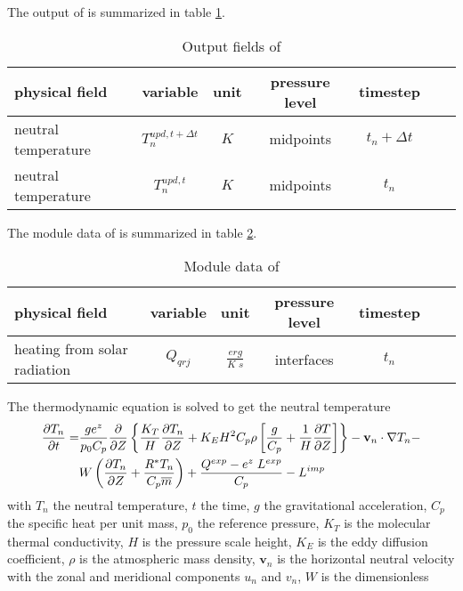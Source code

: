 %
The output of  is summarized in table
\ref{tab:output_dt}.
%
\begin{table}[tb]
\begin{tabular}{|p{3.5cm} ||c|c|c|c|c|c|} \hline
physical field               & variable        & unit&pressure
level& timestep \\ \hline \hline
neutral temperature    &       {$T_n^{upd,t+\Delta t}$}     & $K$   & midpoints  & $t_n+\Delta t$ \\
neutral temperature     &       {$T_n^{upd,t}$}     & $K$   &
midpoints & $t_n$
\\ \hline \hline
\end{tabular}
\caption{Output fields of } \label{tab:output_dt}
\end{table}
%
%
The module data of  is summarized in table
\ref{tab:module_dt}.
%
\begin{table}[tb]
\begin{tabular}{|p{3.5cm} ||c|c|c|c|c|c|} \hline
physical field               & variable        & unit&pressure
level& timestep \\ \hline \hline heating from solar radiation    &
{$Q_{qrj}$}     & $\frac{erg}{K \; s}$   & interfaces  & $t_n$
\\ \hline \hline
\end{tabular}
\caption{Module data of } \label{tab:module_dt}
\end{table}
%
The thermodynamic equation is solved to get the neutral temperature
%
\begin{align}
  \frac{\partial T_n}{\partial t} = & \frac{g e^z}{p_0 C_p}\frac{\partial}{\partial Z}
  \left\{ \frac{K_T}{H} \frac{\partial T_n}{\partial Z} + K_E H^2 C_p \rho \left[
   \frac{g}{C_p} + \frac{1}{H}\frac{\partial T}{\partial
   Z}\right]\right\} - \mathbf{v}_n\cdot \nabla T_n - \notag  \\
   {}&  W \left(
   \frac{\partial T_n}{\partial Z} + \frac{R^* T_n}{C_p \overline{m}}
   \right) + \frac{Q^{exp}-e^z \; L^{exp}}{C_p} - L^{imp} \label{eq:dt_1}
\end{align}
%
with $T_n$ the neutral temperature, $t$ the time, $g$ the
gravitational acceleration, $C_p$ the specific heat per unit mass,
$p_0 $ the reference pressure, $K_T$ is the molecular thermal
conductivity, $H$ is the pressure scale height, $K_E$ is the eddy
diffusion coefficient, $\rho$ is the atmospheric mass density,
$\mathbf{v}_n$ is the horizontal neutral velocity with the zonal and
meridional components $u_n$ and $v_n$, $W$ is the dimensionless
